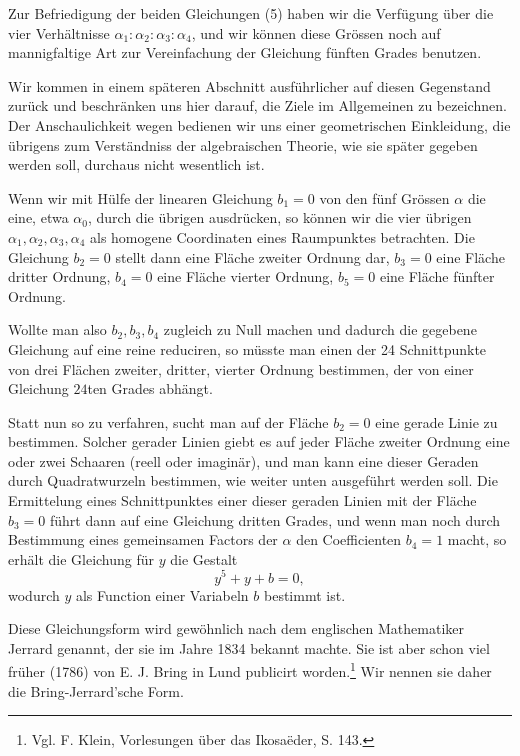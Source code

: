\documentclass[11pt]{article}
\begin{document}
Zur Befriedigung der beiden Gleichungen (5) haben wir die Verfügung über die vier Verhältnisse $\alpha_1:\alpha_2:\alpha_3:\alpha_4$, und wir können diese Grössen noch auf mannigfaltige Art zur Vereinfachung der Gleichung fünften Grades benutzen.

Wir kommen in einem späteren Abschnitt ausführlicher auf diesen Gegenstand zurück und beschränken uns hier darauf, die Ziele im Allgemeinen zu bezeichnen. Der Anschaulichkeit wegen bedienen wir uns einer geometrischen Einkleidung, die übrigens zum Verständniss der algebraischen Theorie, wie sie später gegeben werden soll, durchaus nicht wesentlich ist.

Wenn wir mit Hülfe der linearen Gleichung $b_1=0$ von den fünf Grössen $\alpha$ die eine, etwa $\alpha_0$, durch die übrigen ausdrücken, so können wir die vier übrigen $\alpha_1,\alpha_2,\alpha_3,\alpha_4$ als homogene Coordinaten eines Raumpunktes betrachten. Die Gleichung $b_2=0$ stellt dann eine Fläche zweiter Ordnung dar, $b_3=0$ eine Fläche dritter Ordnung, $b_4=0$ eine Fläche vierter Ordnung, $b_5=0$ eine Fläche fünfter Ordnung.

Wollte man also $b_2,b_3,b_4$ zugleich zu Null machen und dadurch die gegebene Gleichung auf eine reine reduciren, so müsste man einen der 24 Schnittpunkte von drei Flächen zweiter, dritter, vierter Ordnung bestimmen, der von einer Gleichung $24$ten Grades abhängt.

Statt nun so zu verfahren, sucht man auf der Fläche $b_2=0$ eine gerade Linie zu bestimmen. Solcher gerader Linien giebt es auf jeder Fläche zweiter Ordnung eine oder zwei Schaaren (reell oder imaginär), und man kann eine dieser Geraden durch Quadratwurzeln bestimmen, wie weiter unten ausgeführt werden soll. Die Ermittelung eines Schnittpunktes einer dieser geraden Linien mit der Fläche $b_3=0$ führt dann auf eine Gleichung dritten Grades, und wenn man noch durch Bestimmung eines gemeinsamen Factors der $\alpha$ den Coefficienten $b_4=1$ macht, so erhält die Gleichung für $y$ die Gestalt
\begin{equation}
y^5+y+b=0,
\tag{6}
\end{equation}
wodurch $y$ als Function einer Variabeln $b$ bestimmt ist.

Diese Gleichungsform wird gewöhnlich nach dem englischen Mathematiker Jerrard genannt, der sie im Jahre 1834 bekannt machte. Sie ist aber schon viel früher (1786) von E. J. Bring in Lund publicirt worden.\footnote{Vgl. F. Klein, Vorlesungen über das Ikosaëder, S. 143.} Wir nennen sie daher die Bring-Jerrard'sche Form.
\end{document}
